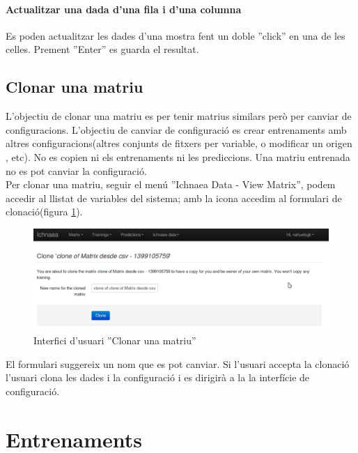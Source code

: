 \paragraph*{Actualitzar una dada d'una fila i d'una columna} Es poden actualitzar les dades d'una mostra fent un doble ''click'' en una de les celles. Prement ''Enter'' es guarda el resultat.


\subsection{Clonar una matriu}
\label{subsec:clone_matrix}
L'objectiu de clonar una matriu es per tenir matrius similars però per canviar de configuracions. L'objectiu de canviar de configuració es crear entrenaments amb altres configuracions(altres conjunts de fitxers per variable, o modificar un origen , etc). No es copien ni els entrenaments ni les prediccions. Una matriu entrenada no es pot canviar la configuració.\\

Per clonar una matriu, seguir el menú ''Ichnaea Data - View Matrix'', podem accedir al llistat de variables del sistema; amb la icona \iconclone accedim al formulari de clonaci\'{o}(figura \ref{fig:cloneMatrix}). 
\begin{figure}[h!]
  \centering
  \includegraphics[scale=0.2]{img/userguide/clone_matrix}
  \caption{Interfici d'usuari ''Clonar una matriu''}
  \label{fig:cloneMatrix}
\end{figure}
El formulari suggereix un nom que es pot canviar. Si l'usuari accepta la clonaci\'{o} l'usuari clona les dades i la configuraci\'{o} i es dirigir\`{a} a la la interfície de configuració.


\section{Entrenaments}
